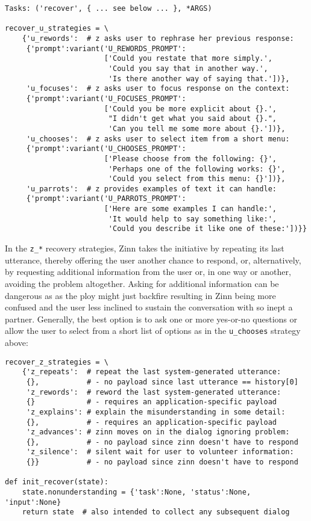 \documentclass[letterpaper,12pt]{article}
\begin{document}
\begin{verbatim}
Tasks: ('recover', { ... see below ... }, *ARGS)

recover_u_strategies = \
    {'u_rewords':  # z asks user to rephrase her previous response:
     {'prompt':variant('U_REWORDS_PROMPT':
                       ['Could you restate that more simply.',
                        'Could you say that in another way.',
                        'Is there another way of saying that.'])},
     'u_focuses':  # z asks user to focus response on the context:
     {'prompt':variant('U_FOCUSES_PROMPT':
                       ['Could you be more explicit about {}.',
                        "I didn't get what you said about {}.",
                        'Can you tell me some more about {}.'])},
     'u_chooses':  # z asks user to select item from a short menu:
     {'prompt':variant('U_CHOOSES_PROMPT':
                       ['Please choose from the following: {}',
                        'Perhaps one of the following works: {}',
                        'Could you select from this menu: {}'])},
     'u_parrots':  # z provides examples of text it can handle:
     {'prompt':variant('U_PARROTS_PROMPT':
                       ['Here are some examples I can handle:',
                        'It would help to say something like:',
                        'Could you describe it like one of these:'])}}
\end{verbatim}

In the {\tt{z_*}} recovery strategies, Zinn takes the initiative by repeating its last utterance, thereby offering the user another chance to respond, or, alternatively, by requesting additional information from the user or, in one way or another, avoiding the problem altogether.  Asking for additional information can be dangerous as as the ploy might just backfire resulting in Zinn being more confused and the user less inclined to sustain the conversation with so inept a partner.  Generally, the best option is to ask one or more yes-or-no questions or allow the user to select from a short list of options as in the {\tt{u\_chooses}} strategy above:
%
\begin{verbatim}
recover_z_strategies = \
    {'z_repeats':  # repeat the last system-generated utterance:
     {},           # - no payload since last utterance == history[0]
     'z_rewords':  # reword the last system-generated utterance: 
     {}            # - requires an application-specific payload
     'z_explains': # explain the misunderstanding in some detail:
     {},           # - requires an application-specific payload
     'z_advances': # zinn moves on in the dialog ignoring problem:  
     {},           # - no payload since zinn doesn't have to respond 
     'z_silence':  # silent wait for user to volunteer information:
     {}}           # - no payload since zinn doesn't have to respond 

def init_recover(state):
    state.nonunderstanding = {'task':None, 'status':None, 'input':None}
    return state  # also intended to collect any subsequent dialog
\end{verbatim}
\end{document}
